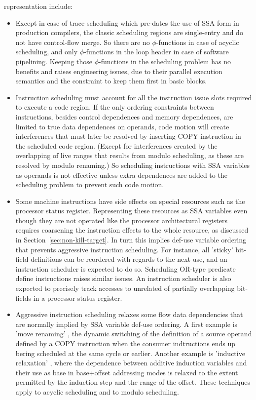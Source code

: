 representation include: \begin{itemize}

\item Except in case of trace scheduling which pre-dates the use of SSA form in
production compilers, the classic scheduling regions are single-entry and do not
have control-flow merge. So there are no $\phi$-functions in case of acyclic
scheduling, and only $\phi$-functions in the loop header in case of software
pipelining. Keeping those $\phi$-functions in the scheduling problem has no
benefits and raises engineering issues, due to their parallel execution
semantics and the constraint to keep them first in basic blocks.

\item Instruction scheduling must account for all the instruction issue slots
required to execute a code region. If the only ordering constraints between
instructions, besides control dependences and memory dependences, are limited to
true data dependences on operands, code motion will create interferences that
must later be resolved by inserting COPY instruction in the scheduled code
region. (Except for interferences created by the overlapping of live ranges
that results from modulo scheduling, as these are resolved by modulo renaming.)
So scheduling instructions with SSA variables as operands is not effective
unless extra dependences are added to the scheduling problem to prevent such
code motion. 

\item Some machine instructions have side effects on special resources such as
the processor status register. Representing these resources as SSA variables
even though they are not operated like the processor architectural registers
requires coarsening the instruction effects to the whole resource, as discussed
in Section~\ref{sec:non-kill-target}. In turn this implies def-use variable
ordering that prevents aggressive instruction scheduling. For instance, all
'sticky' bit-field definitions can be reordered with regards to the next use,
and an instruction scheduler is expected to do so. Scheduling OR-type predicate
define instructions \cite{Schlansker_1999_PLDI} raises similar issues. An
instruction scheduler is also expected to precisely track accesses to unrelated
of partially overlapping bit-fields in a processor status register.

\item Aggressive instruction scheduling relaxes some flow data dependencies that
are normally implied by SSA variable def-use ordering. A first example is 'move
renaming' \cite{Young:1998:MICRO}, the dynamic switching of the definition of a
source operand defined by a COPY instruction when the consumer indtructions ends
up bering scheduled at the same cycle or earlier. Another example is 'inductive
relaxation' \cite{Dinechin:1997:PaCT}, where the dependence between additive
induction variables and their use as base in base+offset addressing modes is
relaxed to the extent permitted by the induction step and the range of the
offset. These techniques apply to acyclic scheduling and to modulo scheduling.

\end{itemize}

